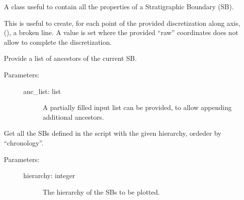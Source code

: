 \documentclass[letterpaper,10pt,english]{sphinxmanual}
\begin{document}
\begin{fulllineitems}
\label{\detokenize{hiegeo:hiegeo.SBound}}
A class useful to contain all the properties of a Stratigraphic
Boundary (SB).

\begin{fulllineitems}
\label{\detokenize{hiegeo:hiegeo.SBound.broken_line}}
This is useful to create, for each point of the provided discretization
along  axis, (), a broken line. A  value is set
where the provided “raw” coordinates does not allow to complete the 
discretization.

\end{fulllineitems}


\begin{fulllineitems}
\label{\detokenize{hiegeo:hiegeo.SBound.get_ancestors}}
Provide a list of ancestors of the current SB.
\begin{description}
\item[{Parameters:}] \leavevmode\begin{description}
\item[{anc\_list: list}] \leavevmode
A partially filled input list can be provided, to
allow appending additional ancestors.

\end{description}

\end{description}

\end{fulllineitems}


\begin{fulllineitems}
\label{\detokenize{hiegeo:hiegeo.SBound.get_obj_above}}
Get all the SBs defined in the script with the given hierarchy,
ordeder by “chronology”.
\begin{description}
\item[{Parameters:}] \leavevmode\begin{description}
\item[{hierarchy: integer}] \leavevmode
The hierarchy of the SBs to be plotted.


\end{description}
\end{description}
\end{fulllineitems}
\end{fulllineitems}
\end{document}
